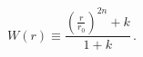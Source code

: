 \begin{equation}
\label{w}
W(r)\equiv \frac{\left(\frac{r}{r_0}\right)^{2n}+k}{1+k} \, .
\end{equation}

